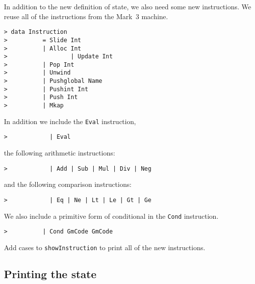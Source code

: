 In addition to the new definition of state, we also need some new
instructions.  We reuse all of the instructions from the Mark~3
machine.
\begin{verbatim}
> data Instruction 
>          = Slide Int
>          | Alloc Int
>                  | Update Int
>          | Pop Int
>          | Unwind
>          | Pushglobal Name
>          | Pushint Int
>          | Push Int
>          | Mkap
\end{verbatim}
%
%
%
%
%
%
%
%
%
In addition we include the \mbox{\tt Eval} instruction,
\begin{verbatim}
>            | Eval
\end{verbatim}
%
the following arithmetic instructions:
\begin{verbatim}
>            | Add | Sub | Mul | Div | Neg
\end{verbatim}
%
%
%
%
%
and the following comparison instructions:
\begin{verbatim}
>            | Eq | Ne | Lt | Le | Gt | Ge
\end{verbatim}
%
%
%
%
%
%
We also include a primitive form of conditional in the \mbox{\tt Cond}
instruction.
\begin{verbatim}
>          | Cond GmCode GmCode
\end{verbatim}
%
\begin{exercise}\label{gm:X:showinstructions4}
Add cases to \mbox{\tt showInstruction} to print all of the new instructions.
\end{exercise}

\subsection{Printing the state}

